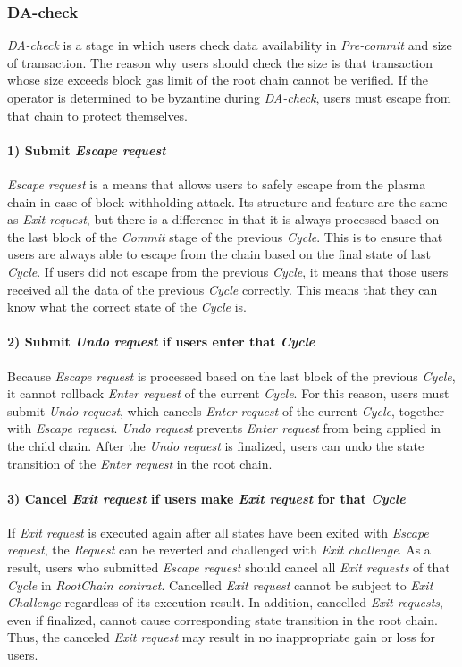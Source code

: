 \documentclass[letterpaper, 11pt]{article}
\begin{document}
\subsubsection{DA-check}
\begin{CJK}{UTF8}{mj}
\emph{DA-check} is a stage in which users check data availability in \emph{Pre-commit} and size of transaction. The reason why users should check the size is that transaction whose size exceeds block gas limit of the root chain cannot be verified. If the operator is determined to be byzantine during \emph{DA-check}, users must escape from that chain to protect themselves.

\paragraph{1) Submit \emph{Escape request}}
\emph{Escape request} is a means that allows users to safely escape from the plasma chain in case of block withholding attack. Its structure and feature are the same as \emph{Exit request}, but there is a difference in that it is always processed based on the last block of the \emph{Commit} stage of the previous \emph{Cycle}. This is to ensure that users are always able to escape from the chain based on the final state of last \emph{Cycle}. If users did not escape from the previous \emph{Cycle}, it means that those users received all the data of the previous \emph{Cycle} correctly. This means that they can know what the correct state of the \emph{Cycle} is.

\paragraph{2) Submit \emph{Undo request} if users enter that \emph{Cycle}}
Because \emph{Escape request} is processed based on the last block of the previous \emph{Cycle}, it cannot rollback \emph{Enter request} of the current \emph{Cycle}. For this reason, users must submit \emph{Undo request}, which cancels \emph{Enter request} of the current \emph{Cycle}, together with \emph{Escape request}. \emph{Undo request} prevents \emph{Enter request} from being applied in the child chain. After the \emph{Undo request} is finalized, users can undo the state transition of the \emph{Enter request} in the root chain.

\paragraph{3) Cancel \emph{Exit request} if users make \emph{Exit request} for that \emph{Cycle}}
If \emph{Exit request} is executed again after all states have been exited with \emph{Escape request}, the \emph{Request} can be reverted and challenged with \emph{Exit challenge}. As a result, users who submitted \emph{Escape request} should cancel all \emph{Exit requests} of that \emph{Cycle} in \emph{RootChain contract}. Cancelled \emph{Exit request} cannot be subject to \emph{Exit Challenge} regardless of its execution result. In addition, cancelled \emph{Exit requests}, even if finalized, cannot cause corresponding state transition in the root chain. Thus, the canceled \emph{Exit request} may result in no inappropriate gain or loss for users.


\end{CJK}
\end{document}
